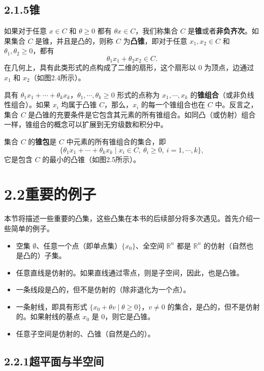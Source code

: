 \documentclass[UTF8, 12pt, fontset=fandol, oneside]{ctexart}
\begin{document}
\subsection*{2.1.5\quad 锥}

如果对于任意 $x\in C$ 和 $\theta\ge 0$ 都有 $\theta x\in C$，我们称集合 $C$ 是\textbf{锥}或者\textbf{非负齐次}。如果集合 $C$ 是锥，并且是凸的，则称 $C$ 为\textbf{凸锥}，即对于任意 $x_1,x_2\in C$ 和 $\theta_1,\theta_2\ge 0$，都有
\[
  \theta_1x_1+\theta_2x_2\in C.
\]
在几何上，具有此类形式的点构成了二维的扇形，这个扇形以 0 为顶点，边通过 $x_1$ 和 $x_2$（如图2.4所示）。

具有 $\theta_1x_1+\cdots+\theta_kx_k$，$\theta_1,\cdots,\theta_k\ge 0$ 形式的点称为 $x_1,\cdots,x_k$ 的\textbf{锥组合}（或非负线性组合）。如果 $x_i$ 均属于凸锥 $C$，那么，$x_i$ 的每一个锥组合也在 $C$ 中。反言之，集合 $C$ 是凸锥的充要条件是它包含其元素的所有锥组合。如同凸（或仿射）组合一样，锥组合的概念可以扩展到无穷级数和积分中。

集合 $C$ 的\textbf{锥包}是 $C$ 中元素的所有锥组合的集合，即
\[
  \{\theta_1x_1+\cdots+\theta_kx_k\mid x_i\in C,\ \theta_i\ge 0,\ i=1,\cdots,k\},
\]
它是包含 $C$ 的最小的凸锥（如图2.5所示）。

\section*{2.2\quad 重要的例子}

本节将描述一些重要的凸集，这些凸集在本书的后续部分将多次遇见。首先介绍一些简单的例子。

\begin{itemize}
  \item 空集 $\emptyset$、任意一个点（即单点集）$\{x_0\}$、全空间 $\mathbb{R}^n$ 都是 $\mathbb{R}^n$ 的仿射（自然也是凸的）子集。
  \item 任意直线是仿射的。如果直线通过零点，则是子空间，因此，也是凸锥。
  \item 一条线段是凸的，但不是仿射的（除非退化为一个点）。
  \item 一条射线，即具有形式 $\{x_0+\theta v\mid \theta\ge 0\}$，$v\ne 0$ 的集合，是凸的，但不是仿射的。如果射线的基点 $x_0$ 是 0，则它是凸锥。
  \item 任意子空间是仿射的、凸锥（自然是凸的）。
\end{itemize}

\subsection*{2.2.1\quad 超平面与半空间}
\end{document}
